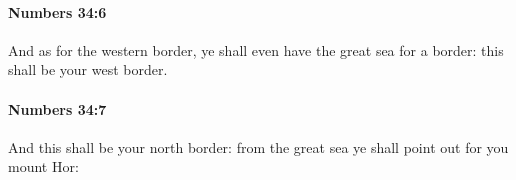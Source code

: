 		\paragraph{Numbers 34:6} %
			\label{NUMBERS-34-6}

			And as for the western border, ye shall even have the great sea for a border: this shall be your west border.


		\paragraph{Numbers 34:7} %
			\label{NUMBERS-34-7}

			And this shall be your north border: from the great sea ye shall point out for you mount Hor:



